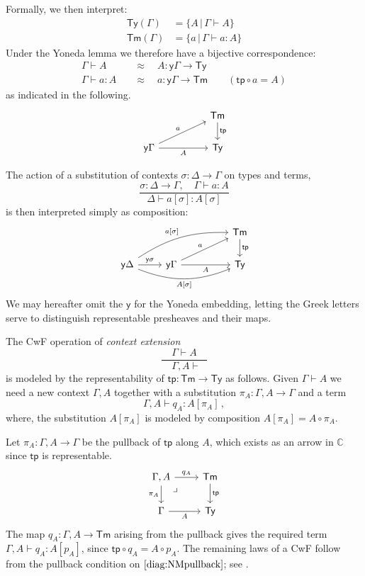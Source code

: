 \documentclass[12pt,reqno]{amsart}
\newcommand{\C}{\ensuremath{\mathbb{C}}}
\newcommand{\y}{\ensuremath{\mathsf{y}}} %
\newcommand{\tp}{\ensuremath{\mathsf{tp}}}
\newcommand{\Tm}{\ensuremath{\mathsf{Tm}}}
\newcommand{\Ty}{\ensuremath{\mathsf{Ty}}}
\renewcommand{\to}{\ensuremath{\rightarrow}}
\newcommand{\G}{\ensuremath{\Gamma}}
\newcommand{\terms}[2]{#1 \vdash #2}
\newcommand{\Gterms}[1]{\terms{\Gamma}{#1}}
\newcommand{\ext}[2]{{#1,#2}}
\newcommand{\pbcorner}{\arrow[dr,phantom,"\lrcorner" very near start, shift right=.5ex]} %
\theoremstyle{remark}
\theoremstyle{definition}
\begin{document}
Formally, we then interpret:
\begin{align*}
 \Ty(\Gamma) &= \{ A \,|\, \Gamma \vdash A\} \\
 \Tm(\Gamma) &= \{ a \,|\, \Gamma \vdash a:A\} 
\end{align*}
Under the Yoneda lemma we therefore have a bijective correspondence:
\begin{align*}
\Gamma\vdash A\quad &\approx\quad A : \y{\Gamma}\to \Ty  \\
\Gterms{a:A}\quad &\approx\quad  a: \y{\Gamma}\to \Tm  \qquad (\tp\circ a = A)
\end{align*}
as indicated in the following.
\[
\begin{tikzcd}
 	&&  {\Tm} \ar[d,"{\tp}"]\\
\y\Gamma \ar[rru, "a"]   \ar[rr ,swap,  "A"]   && {\Ty}
\end{tikzcd}
\]
%

The action of a substitution of contexts $\sigma : \Delta \to \Gamma$ on types and terms,
\[
\frac{\sigma: \Delta \to \Gamma, \quad \Gamma\vdash a:A}{\Delta\vdash a[\sigma] : A[\sigma]}
\]
is then interpreted simply as composition:
\[
\begin{tikzcd}
 	&&&  {\Tm} \ar[d,"{\tp}"]\\
\y{\Delta} \ar[r,  "\y{\sigma}"] \ar[rrru, bend left = 4ex, "{a[\sigma]}"] \ar[rrr, swap, bend right = 5ex, "{A[\sigma]}"] & \y\Gamma \ar[rru, "a"]   \ar[rr ,swap,  "A"]  && {\Ty}
\end{tikzcd}
\]
%
We may hereafter omit the $\y$ for the Yoneda embedding, letting the Greek letters serve to distinguish representable presheaves and their maps.

The CwF operation of \emph{context extension} 
$$\frac{\quad\Gamma\vdash A\quad}{\ \ \ext{\G}{A}\vdash}$$
is modeled by the representability of $\tp : \Tm\to\Ty$ as follows.
%
Given $\Gamma\vdash A$ we need a new context $\ext{\G}{A}$ together with a substitution $\pi_A : \ext{\G}{A} \to \G$ and a term 
\[
\terms{\ext{\G}{A}}{q_A:A[\pi_A]}\,,
\]
where, the substitution $A[\pi_A]$ is modeled by composition $A[\pi_A] = A\circ \pi_A$.

Let $\pi_A: \ext{\G}{A} \to \G$ be the pullback of $\tp$ along $A$, which exists as an arrow in $\C$ since $\tp$ is representable.
%
\begin{equation}\label{diag:NMpullback}
\begin{tikzcd}
{\ext{\G}{A}} \ar[d,swap, "{\pi_A}"] \ar[r, "{q_A}"] \pbcorner &  {\Tm} \ar[d, "{\tp}"]\\
{\G} \ar[r,swap,"A"]   & {\Ty}
\end{tikzcd}
\end{equation}
%
The map $q_A : \ext{\G}{A}\to\Tm$ arising from the pullback gives the required term $\terms{\ext{\G}{A}}{q_A:A[p_A]}$, since $\tp\circ q_A = A \circ p_A$.
The remaining laws of a CwF follow from the pullback condition on $\eqref{diag:NMpullback}$; see \cite{Awodey:NM}.
\end{document}
